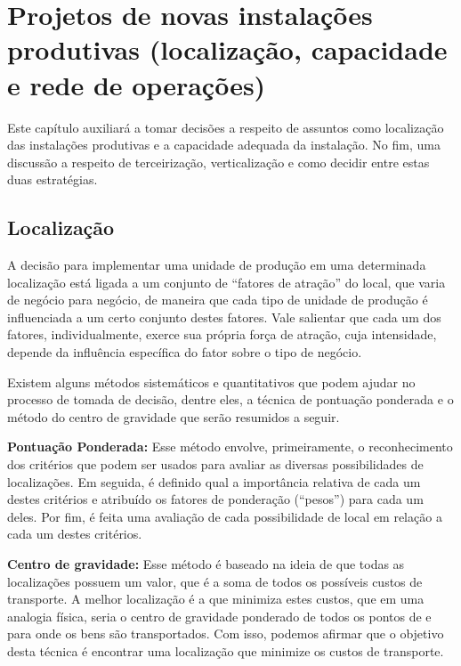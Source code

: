 
\chapter{Projetos de novas instalações produtivas (localização, capacidade e rede de operações)}
\label{chap:projetos_de_novas}

Este capítulo auxiliará a tomar decisões a respeito de assuntos como localização das instalações produtivas e a capacidade adequada da instalação. %
No fim, uma discussão a respeito de terceirização, verticalização e como decidir entre estas duas estratégias.

\section{Localização}
\label{sec:projeto_de_novas_localizacao}

A decisão para implementar uma unidade de produção em uma determinada localização está ligada a um conjunto de ``fatores de atração'' do local, que varia de negócio para negócio, de maneira que cada tipo de unidade de produção é influenciada a um certo conjunto destes fatores. Vale salientar que cada um dos fatores, individualmente, exerce sua própria força de atração, cuja intensidade, depende da influência específica do fator sobre o tipo de negócio.

Existem alguns métodos sistemáticos e quantitativos que podem ajudar no processo de tomada de decisão, dentre eles, a técnica de pontuação ponderada e o método do centro de gravidade que serão resumidos a seguir.

\textbf{Pontuação Ponderada:} Esse método envolve, primeiramente, o reconhecimento dos critérios que podem ser usados para avaliar as diversas possibilidades de localizações. Em seguida, é definido qual a importância relativa de cada um destes critérios e atribuído os fatores de ponderação (``pesos'') para cada um deles. Por fim, é feita uma avaliação de cada possibilidade de local em relação a cada um destes critérios.

\textbf{Centro de gravidade:} Esse método é baseado na ideia de que todas as localizações possuem um valor, que é a soma de todos os possíveis custos de transporte. A melhor localização é a que minimiza estes custos, que em uma analogia física, seria o centro de gravidade ponderado de todos os pontos de e para onde os bens são transportados. Com isso, podemos afirmar que o objetivo desta técnica é encontrar uma localização que minimize os custos de transporte.


